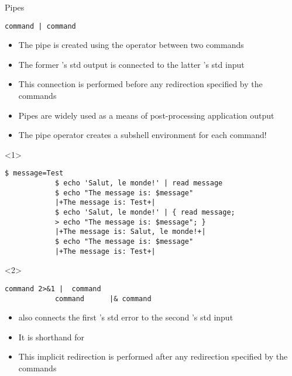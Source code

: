 \begin{frame}[fragile]{Pipes}
    \vspace{-1mm}
    \begin{lstlisting}[style=MyBash, numbers=none]
        command | command
    \end{lstlisting}
    \begin{itemize}
        \item The pipe is created using the \PB{\texttt{|}} operator between two commands
        \item The former 's std output is connected to the latter 's std input
        \item This connection is performed before any redirection specified by the commands
        \item Pipes are widely used as a means of post-processing application output
        \item \alert{The pipe operator creates a subshell environment for each command!}
    \end{itemize}
    \begin{onlyenv}<1>
        \begin{lstlisting}[style=MyBash]
            $ message=Test
            $ echo 'Salut, le monde!' | read message
            $ echo "The message is: $message"
            |+The message is: Test+|
            $ echo 'Salut, le monde!' | { read message;
            > echo "The message is: $message"; }
            |+The message is: Salut, le monde!+|
            $ echo "The message is: $message"
            |+The message is: Test+|
        \end{lstlisting}
    \end{onlyenv}
    \begin{onlyenv}<2>
        \begin{lstlisting}[style=MyBash, numbers=none]
            command 2>&1 |  command
            command      |& command
        \end{lstlisting}
        \begin{itemize}
            \item \PB{\texttt{|\&}} also connects the first 's std error to the second 's std input
            \item It is shorthand for 
            \item This implicit redirection is performed after any redirection specified by the commands
        \end{itemize}
    \end{onlyenv}
\end{frame}
